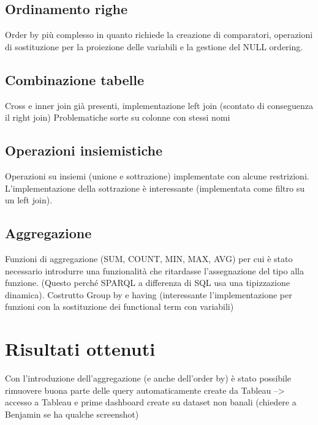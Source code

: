 \subsection{Ordinamento righe}
Order by più complesso in quanto richiede la creazione di comparatori, operazioni di sostituzione per la proiezione delle variabili 
e la gestione del NULL ordering.

\subsection{Combinazione tabelle}
Cross e inner join già presenti, implementazione left join (scontato di conseguenza il right join) 
Problematiche sorte su colonne con stessi nomi

\subsection{Operazioni insiemistiche}
Operazioni su insiemi (unione e sottrazione) implementate con alcune restrizioni.
L'implementazione della sottrazione è interessante (implementata come filtro su un left join).

\subsection{Aggregazione}
Funzioni di aggregazione (SUM, COUNT, MIN, MAX, AVG) per cui è stato necessario introdurre una funzionalità che ritardasse l'assegnazione del 
tipo alla funzione. (Questo perché SPARQL a differenza di SQL usa una tipizzazione dinamica).
Costrutto Group by e having (interessante l'implementazione per funzioni con la sostituzione dei functional term con variabili)

\section{Risultati ottenuti}
Con l'introduzione dell'aggregazione (e anche dell'order by) è stato possibile rimuovere buona parte delle query automaticamente create da Tableau --> accesso a Tableau 
e prime dashboard create su dataset non banali (chiedere a Benjamin se ha qualche screenshot)
